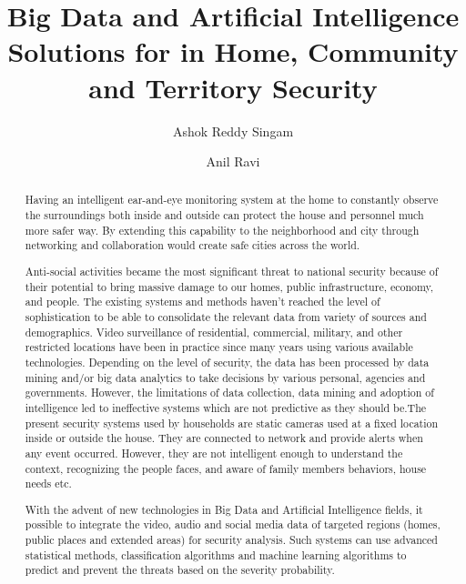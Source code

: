 \documentclass[sigconf]{acmart}
\begin{document}
\title{Big Data and Artificial Intelligence Solutions for in Home, Community and Territory Security}


\author{Ashok Reddy Singam}

\author{Anil Ravi}

\begin{abstract}
Having an intelligent ear-and-eye monitoring system at the home to constantly observe the surroundings both inside and outside can protect the house and personnel much more safer way. By extending this capability to the neighborhood and city through networking and collaboration would create safe cities across the world.

Anti-social activities became the most significant threat to national security because of their potential to bring massive damage to our homes, public infrastructure, economy, and people. The existing systems and methods haven't reached the level of sophistication to be able to consolidate the relevant data from variety of sources and demographics. Video surveillance of residential, commercial, military, and other restricted locations have been in practice since many years using various available technologies. Depending on the level of security, the data has been processed by data mining and/or big data analytics to take decisions by various personal, agencies and governments. However, the limitations of data collection, data mining and adoption of intelligence led to ineffective systems which are not predictive as they should be.The present security systems used by households are static cameras used at a  fixed location inside or outside the house. They are connected to network and provide alerts when any event occurred. However, they are not intelligent enough to understand the context, recognizing the people faces, and aware of family members behaviors, house needs etc.

With the advent of new technologies in Big Data and Artificial Intelligence fields, it possible to integrate the video, audio and social media data of targeted regions (homes, public places and extended areas) for security analysis. Such systems can use advanced statistical methods, classification algorithms and machine learning algorithms to predict and prevent the threats based on the severity probability.

\end{abstract}
\end{document}
